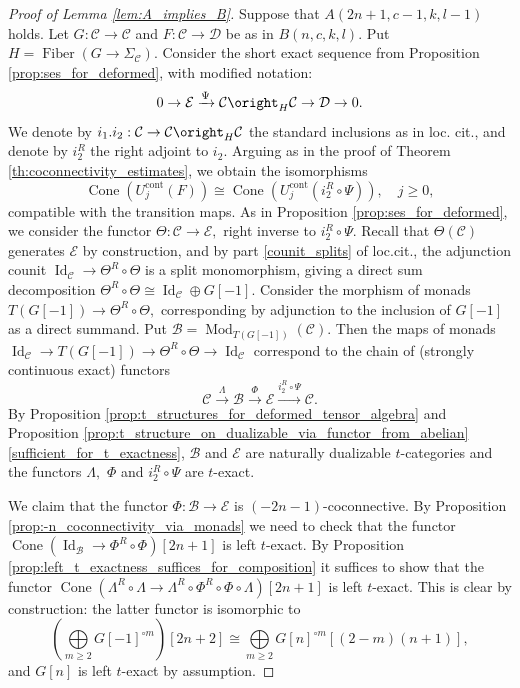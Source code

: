 \documentclass[11pt,leqno]{amsart}
\numberwithin{equation}{section}
\newcommand{\biggplus}[1][]{\mathop{\bigoplus}\limits_{#1}}
\newcommand{\xto}{\xrightarrow}
\newcommand{\Cone}{\operatorname{Cone}}
\newcommand{\Fiber}{\operatorname{Fiber}}
\newcommand{\cont}{\operatorname{cont}}
\newcommand{\cD}{{\mathcal D}}
\newcommand{\cB}{{\mathcal B}}
\newcommand{\cC}{{\mathcal C}}
\newcommand{\cE}{{\mathcal E}}
\newcommand{\Id}{\operatorname{Id}}
\newcommand{\Mod}{\operatorname{Mod}}
\begin{document}
\begin{proof}[Proof of Lemma \ref{lem:A_implies_B}]
Suppose that $A(2n+1,c-1,k,l-1)$ holds. Let $G:\cC\to\cC$ and $F:\cC\to\cD$ be as in $B(n,c,k,l).$ Put $H=\Fiber(G\to\Sigma_{\cC}).$ Consider the short exact sequence from Proposition \ref{prop:ses_for_deformed}, with modified notation:
\begin{equation*}
0\to \cE\xto{\Psi} \cC\oright_H \cC\to\cD\to 0.
\end{equation*}
We denote by $i_1.i_2:\cC\to\cC\oright_H \cC$ the standard inclusions as in loc. cit., and denote by $i_2^R$ the right adjoint to $i_2.$ Arguing as in the proof of Theorem \ref{th:coconnectivity_estimates}, we obtain the isomorphisms
\begin{equation*}\Cone(U_j^{\cont}(F))\cong \Cone(U_j^{\cont}(i_2^R\circ\Psi)),\quad j\geq 0,
\end{equation*}
compatible with the transition maps. As in Proposition \ref{prop:ses_for_deformed}, we consider the functor $\Theta:\cC\to\cE,$ right inverse to $i_2^R\circ\Psi.$ Recall that $\Theta(\cC)$ generates $\cE$ by construction, and by part \ref{counit_splits} of loc.cit., the adjunction counit $\Id_{\cC}\to \Theta^R\circ\Theta$ is a split monomorphism, giving a direct sum decomposition $\Theta^R\circ\Theta\cong \Id_{\cC}\oplus G[-1].$ Consider the morphism of monads $T(G[-1])\to \Theta^R\circ\Theta,$ corresponding by adjunction to the inclusion of $G[-1]$ as a direct summand. Put $\cB=\Mod_{T(G[-1])}(\cC).$ Then the maps of monads $\Id_{\cC}\to T(G[-1])\to\Theta^R\circ\Theta\to\Id_{\cC}$ correspond to the chain of (strongly continuous exact) functors
\begin{equation*}
\cC\xto{\Lambda}\cB\xto{\Phi}\cE\xto{i_2^R\circ\Psi}\cC.
\end{equation*}
By Proposition \ref{prop:t_structures_for_deformed_tensor_algebra} and Proposition \ref{prop:t_structure_on_dualizable_via_functor_from_abelian} \ref{sufficient_for_t_exactness}, $\cB$ and $\cE$ are naturally dualizable $t$-categories and the functors $\Lambda,$ $\Phi$ and $i_2^R\circ\Psi$ are $t$-exact.

We claim that the functor $\Phi:\cB\to\cE$ is $(-2n-1)$-coconnective. By Proposition \ref{prop:-n_coconnectivity_via_monads} we need to check that the functor $\Cone(\Id_{\cB}\to \Phi^R\circ\Phi)[2n+1]$ is left $t$-exact. By Proposition \ref{prop:left_t_exactness_suffices_for_composition} it suffices to show that the functor $\Cone(\Lambda^R\circ\Lambda\to\Lambda^R\circ\Phi^R\circ\Phi\circ\Lambda)[2n+1]$ is left $t$-exact. This is clear by construction: the latter functor is isomorphic to
\begin{equation*}
(\biggplus[m\geq 2]G[-1]^{\circ m})[2n+2]\cong\biggplus[m\geq 2] G[n]^{\circ m}[(2-m)(n+1)], 
\end{equation*}  
and $G[n]$ is left $t$-exact by assumption.


\end{proof}
\end{document}
